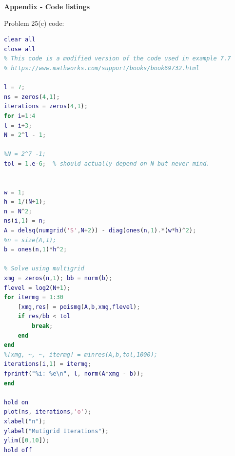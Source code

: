 \documentclass[12pt]{article}
\begin{document}
\bigbreak

{\hspace{-4 ex} \huge \textbf{Appendix - Code listings}}\bigbreak

\large{Problem 25(c) code:}
\begin{lstlisting}[language=MATLAB]
clear all
close all
% This code is a modified version of the code used in example 7.7
% https://www.mathworks.com/support/books/book69732.html

l = 7;
ns = zeros(4,1);
iterations = zeros(4,1);
for i=1:4
l = i+3;
N = 2^l - 1;

%N = 2^7 -1;
tol = 1.e-6;  % should actually depend on N but never mind.


w = 1;
h = 1/(N+1);
n = N^2;
ns(i,1) = n;
A = delsq(numgrid('S',N+2)) - diag(ones(n,1).*(w*h)^2);
%n = size(A,1);
b = ones(n,1)*h^2;

% Solve using multigrid
xmg = zeros(n,1); bb = norm(b);
flevel = log2(N+1);
for itermg = 1:30
	[xmg,res] = poismg(A,b,xmg,flevel);
	if res/bb < tol
		break;
	end
end
%[xmg, ~, ~, itermg] = minres(A,b,tol,1000);
iterations(i,1) = itermg;
fprintf("%i: %e\n", l, norm(A*xmg - b));
end

hold on
plot(ns, iterations,'o');
xlabel("n");
ylabel("Mutigrid Iterations");
ylim([0,10]);
hold off
\end{lstlisting}
\end{document}
